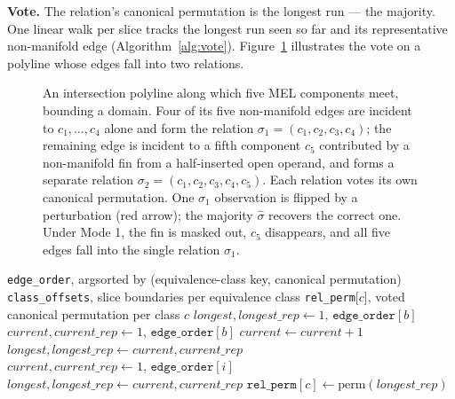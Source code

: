 \documentclass{egpubl}
\begin{document}
\textbf{Vote.} The relation's canonical permutation is the longest run --- the majority. One linear walk per slice tracks the longest run seen so far and its representative non-manifold edge (Algorithm~\ref{alg:vote}). Figure~\ref{fig:relation_majority_vote} illustrates the vote on a polyline whose edges fall into two relations.

\begin{figure}[t]
\centering

\caption{An intersection polyline along which five MEL components meet, bounding a domain. Four of its five non-manifold edges are incident to $c_1, \ldots, c_4$ alone and form the relation $\sigma_1 = (c_1, c_2, c_3, c_4)$; the remaining edge is incident to a fifth component $c_5$ contributed by a non-manifold fin from a half-inserted open operand, and forms a separate relation $\sigma_2 = (c_1, c_2, c_3, c_4, c_5)$. Each relation votes its own canonical permutation. One $\sigma_1$ observation is flipped by a perturbation (red arrow); the majority $\hat\sigma$ recovers the correct one. Under Mode 1, the fin is masked out, $c_5$ disappears, and all five edges fall into the single relation $\sigma_1$.}
\label{fig:relation_majority_vote}
\end{figure}

\begin{algorithm}[t]
\caption{Per-relation canonical-permutation vote}
\label{alg:vote}
\begin{algorithmic}[1]
\Require \texttt{edge\_order}, argsorted by (equivalence-class key, canonical permutation)
\Require \texttt{class\_offsets}, slice boundaries per equivalence class
\Ensure \texttt{rel\_perm}[$c$], voted canonical permutation per class $c$
\For{each class slice $[b, e)$ in \texttt{class\_offsets} \textbf{in parallel}}
  \State $\textit{longest}, \textit{longest\_rep} \gets 1,\, \texttt{edge\_order}[b]$
  \State $\textit{current}, \textit{current\_rep} \gets 1,\, \texttt{edge\_order}[b]$
  \For{$i \in [b+1, e)$}
      \State $\textit{current} \gets \textit{current} + 1$
    \Else
        \State $\textit{longest}, \textit{longest\_rep} \gets \textit{current}, \textit{current\_rep}$
      \EndIf
      \State $\textit{current}, \textit{current\_rep} \gets 1,\, \texttt{edge\_order}[i]$
    \EndIf
  \EndFor
    \State $\textit{longest}, \textit{longest\_rep} \gets \textit{current}, \textit{current\_rep}$
  \EndIf
  \State $\texttt{rel\_perm}[c] \gets \textrm{perm}(\textit{longest\_rep})$
\EndFor
\end{algorithmic}
\end{algorithm}
\end{document}
